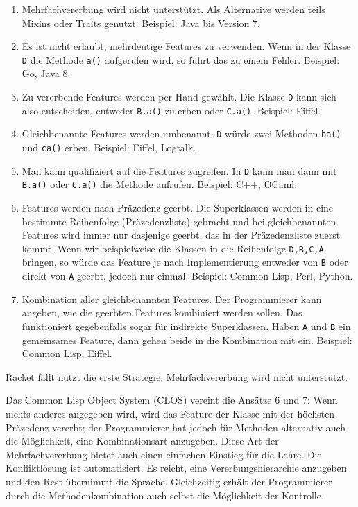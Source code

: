 \begin{enumerate}
 \item Mehrfachvererbung wird nicht unterstützt. Als Alternative werden teils Mixins oder Traits genutzt. Beispiel: Java bis Version 7.
 \item Es ist nicht erlaubt, mehrdeutige Features zu verwenden. Wenn in der Klasse \texttt{D} die Methode \texttt{a()} aufgerufen wird, so führt das zu einem Fehler. Beispiel: Go, Java 8.
 \item Zu vererbende Features werden per Hand gewählt. Die Klasse \texttt{D} kann sich also entscheiden, entweder \texttt{B.a()} zu erben oder \texttt{C.a()}. Beispiel: Eiffel.
 \item Gleichbenannte Features werden umbenannt. \texttt{D} würde zwei Methoden \texttt{ba()} und \texttt{ca()} erben. Beispiel: Eiffel, Logtalk.
 \item Man kann qualifiziert auf die Features zugreifen. In \texttt{D} kann man dann mit \texttt{B.a()} oder \texttt{C.a()} die Methode aufrufen. Beispiel: C++, OCaml.
 \item Features werden nach Präzedenz geerbt. Die Superklassen werden in eine bestimmte Reihenfolge (Präzedenzliste) gebracht und bei gleichbenannten Features wird immer nur dasjenige geerbt, das in der Präzedenzliste zuerst kommt. Wenn wir beispielweise die Klassen in die Reihenfolge \texttt{D,B,C,A} bringen, so würde das Feature je nach Implementierung entweder von \texttt{B} oder direkt von \texttt{A} geerbt, jedoch nur einmal. Beispiel: Common Lisp, Perl, Python.
 \item Kombination aller gleichbenannten Features. Der Programmierer kann angeben, wie die geerbten Features kombiniert werden sollen. Das funktioniert gegebenfalls sogar für indirekte Superklassen. Haben \texttt{A} und \texttt{B} ein gemeinsames Feature, dann gehen beide in die Kombination mit ein. Beispiel: Common Lisp, Eiffel.
\end{enumerate}


Racket fällt nutzt die erste Strategie. Mehrfachvererbung wird nicht unterstützt.

Das Common Lisp Object System (CLOS) vereint die Ansätze 6 und 7: Wenn nichts anderes angegeben wird, wird das Feature der Klasse mit der höchsten Präzedenz vererbt; der Programmierer hat jedoch für Methoden alternativ auch die Möglichkeit, eine Kombinationsart anzugeben. Diese Art der Mehrfachvererbung bietet auch einen einfachen Einstieg für die Lehre. Die Konfliktlösung ist automatisiert. Es reicht, eine Vererbungshierarchie anzugeben und den Rest übernimmt die Sprache. Gleichzeitig erhält der Programmierer durch die Methodenkombination auch selbst die Möglichkeit der Kontrolle.

